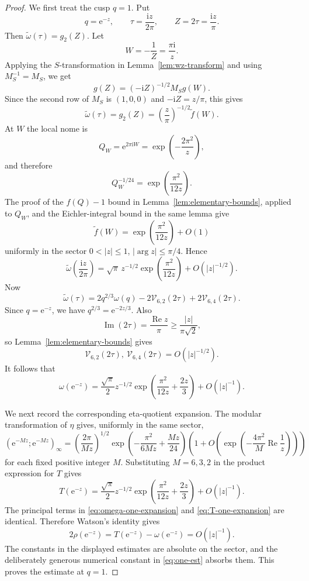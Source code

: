 \documentclass[11pt]{article}
\theoremstyle{remark}
\newcommand{\ii}{\mathrm i}
\newcommand{\e}{\mathrm e}
\newcommand{\Repart}{\operatorname{Re}}
\newcommand{\Impart}{\operatorname{Im}}
\begin{document}
\begin{proof}
We first treat the cusp $q=1$.  Put
\[
q=\e^{-z},\qquad \tau=\frac{\ii z}{2\pi},\qquad Z=2\tau=\frac{\ii z}{\pi}.
\]
Then $\widetilde\omega(\tau)=g_2(Z)$.  Let
\[
W=-\frac1Z=\frac{\pi\ii}{z}.
\]
Applying the $S$-transformation in Lemma~\ref{lem:wz-transform} and using
$M_S^{-1}=M_S$, we get
\[
g(Z)=(-\ii Z)^{-1/2}M_Sg(W).
\]
Since the second row of $M_S$ is $(1,0,0)$ and $-\ii Z=z/\pi$, this gives
\begin{equation}\label{eq:omega-at-one-transform}
\widetilde\omega(\tau)=g_2(Z)=\left(\frac{z}{\pi}\right)^{-1/2}\widetilde f(W).
\end{equation}
At $W$ the local nome is
\[
Q_W=\e^{2\pi\ii W}=\exp\left(-\frac{2\pi^2}{z}\right),
\]
and therefore
\[
Q_W^{-1/24}=\exp\left(\frac{\pi^2}{12z}\right).
\]
The proof of the $f(Q)-1$ bound in Lemma~\ref{lem:elementary-bounds}, applied to $Q_W$, and the Eichler-integral bound in the same lemma give
\[
\widetilde f(W)
=
\exp\left(\frac{\pi^2}{12z}\right)+O(1)
\]
uniformly in the sector $0<|z|\leq1$, $|\arg z|\leq\pi/4$.  Hence
\begin{equation}\label{eq:tilde-omega-one-expansion}
\widetilde\omega\left(\frac{\ii z}{2\pi}\right)
=
\sqrt\pi\,z^{-1/2}
\exp\left(\frac{\pi^2}{12z}\right)
+
O(|z|^{-1/2}).
\end{equation}
Now
\[
\widetilde\omega(\tau)
=
2q^{2/3}\omega(q)-2\mathcal V_{6,2}(2\tau)+2\mathcal V_{6,4}(2\tau).
\]
Since $q=\e^{-z}$, we have $q^{2/3}=\e^{-2z/3}$.  Also
\[
\Impart(2\tau)=\frac{\Repart z}{\pi}\geq \frac{|z|}{\pi\sqrt2},
\]
so Lemma~\ref{lem:elementary-bounds} gives
\[
\mathcal V_{6,2}(2\tau),\ \mathcal V_{6,4}(2\tau)=O(|z|^{-1/2}).
\]
It follows that
\begin{equation}\label{eq:omega-one-expansion}
\omega(\e^{-z})
=
\frac{\sqrt\pi}{2}z^{-1/2}
\exp\left(\frac{\pi^2}{12z}+\frac{2z}{3}\right)
+
O(|z|^{-1}).
\end{equation}

We next record the corresponding eta-quotient expansion.  The modular transformation of
$\eta$ gives, uniformly in the same sector,
\[
(\e^{-Mz};\e^{-Mz})_\infty
=
\left(\frac{2\pi}{Mz}\right)^{1/2}
\exp\left(-\frac{\pi^2}{6Mz}+\frac{Mz}{24}\right)
\left(1+O\left(\exp\left(-\frac{4\pi^2}{M}\Repart\frac1z\right)\right)\right)
\]
for each fixed positive integer $M$.  Substituting $M=6,3,2$ in the product expression for
$T$ gives
\begin{equation}\label{eq:T-one-expansion}
T(\e^{-z})
=
\frac{\sqrt\pi}{2}z^{-1/2}
\exp\left(\frac{\pi^2}{12z}+\frac{2z}{3}\right)
+
O(|z|^{-1}).
\end{equation}
The principal terms in \eqref{eq:omega-one-expansion} and \eqref{eq:T-one-expansion} are identical.  Therefore Watson's identity gives
\[
2\rho(\e^{-z})=T(\e^{-z})-\omega(\e^{-z})=O(|z|^{-1}).
\]
The constants in the displayed estimates are absolute on the sector, and the deliberately generous numerical constant in \eqref{eq:one-est} absorbs them.  This proves the estimate at $q=1$.


\end{proof}
\end{document}
